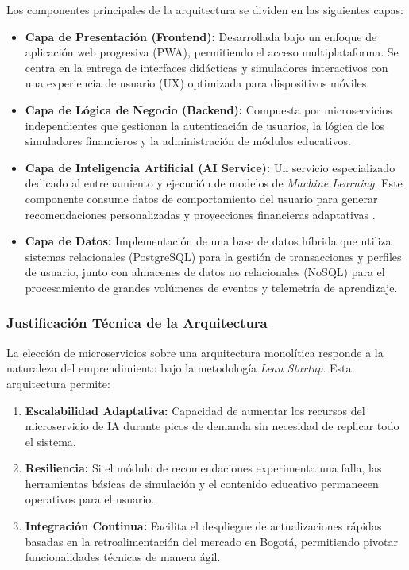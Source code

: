 Los componentes principales de la arquitectura se dividen en las siguientes capas:

\begin{itemize}
	\item \textbf{Capa de Presentación (Frontend):} Desarrollada bajo un enfoque de aplicación web progresiva (PWA), permitiendo el acceso multiplataforma. Se centra en la entrega de interfaces didácticas y simuladores interactivos con una experiencia de usuario (UX) optimizada para dispositivos móviles.
	
	\item \textbf{Capa de Lógica de Negocio (Backend):} Compuesta por microservicios independientes que gestionan la autenticación de usuarios, la lógica de los simuladores financieros y la administración de módulos educativos. 
	
	\item \textbf{Capa de Inteligencia Artificial (AI Service):} Un servicio especializado dedicado al entrenamiento y ejecución de modelos de \textit{Machine Learning}. Este componente consume datos de comportamiento del usuario para generar recomendaciones personalizadas y proyecciones financieras adaptativas \parencite{BBVAResearch01}.
	
	\item \textbf{Capa de Datos:} Implementación de una base de datos híbrida que utiliza sistemas relacionales (PostgreSQL) para la gestión de transacciones y perfiles de usuario, junto con almacenes de datos no relacionales (NoSQL) para el procesamiento de grandes volúmenes de eventos y telemetría de aprendizaje.
\end{itemize}

\subsubsection*{Justificación Técnica de la Arquitectura}
La elección de microservicios sobre una arquitectura monolítica responde a la naturaleza del emprendimiento bajo la metodología \textit{Lean Startup}. Esta arquitectura permite:
\begin{enumerate}
	\item \textbf{Escalabilidad Adaptativa:} Capacidad de aumentar los recursos del microservicio de IA durante picos de demanda sin necesidad de replicar todo el sistema.
	\item \textbf{Resiliencia:} Si el módulo de recomendaciones experimenta una falla, las herramientas básicas de simulación y el contenido educativo permanecen operativos para el usuario.
	\item \textbf{Integración Continua:} Facilita el despliegue de actualizaciones rápidas basadas en la retroalimentación del mercado en Bogotá, permitiendo pivotar funcionalidades técnicas de manera ágil.
\end{enumerate}

